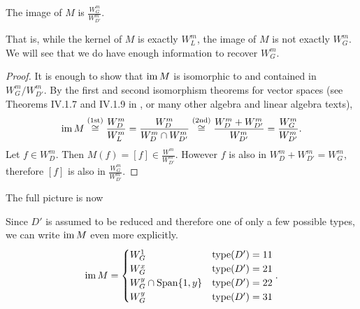 \begin{proposition}
  \label{prop_im_M}
  The image of $M$ is $\frac{W_G^m}{W_{D'}^m}$.
\end{proposition}
That is, while the kernel of $M$ is exactly $W_L^m$,
the image of $M$ is not exactly $W_G^m$.
We will see that we do have enough information to recover $W_G^m$.
\begin{proof}
  It is enough to show that $\operatorname{im} M$ is isomorphic to and contained in $W_G^m / W_{D'}^m$.
  By the first and second isomorphism theorems for vector spaces
  (see Theorems IV.1.7 and IV.1.9 in \cite{hungerford}, or many other algebra and linear algebra texts),
  \[ \operatorname{im} M \overset{\text{(1st)}}{\cong} \frac {W_D^m} {W_L^m}
           = \frac {W_D^m} {W_D^m \cap W_{D'}^m}
           \overset{\text{(2nd)}}{\cong} \frac {W_D^m + W_{D'}^m} {W_{D'}^m}
           = \frac {W_G^m} {W_{D'}^m}. \]
  Let $f \in W_D^m$.
  Then $M(f) = [f] \in \frac {W^m} {W_{D'}^m}$.
  However $f$ is also in $W_D^m + W_{D'}^m = W_G^m$,
  therefore $[f]$ is also in $\frac {W_G^m} {W_{D'}^m}$.
\end{proof}
The full picture is now
\begin{center}
\end{center}

Since $D'$ is assumed to be reduced and therefore one of only a few possible types,
we can write $\operatorname{im} M$ even more explicitly.
\[
  \operatorname{im} M = \begin{cases}
    W_G^1 & \operatorname{type}(D') = 11 \\
    W_G^x & \operatorname{type}(D') = 21 \\
    W_G^y \cap \operatorname{Span}\{ 1, y \} & \operatorname{type}(D') = 22 \\
    W_G^y & \operatorname{type}(D') = 31
  \end{cases}.
\]

